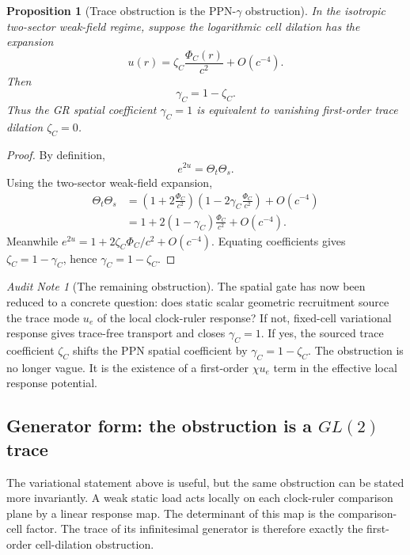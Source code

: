 \documentclass[11pt]{article}
\newtheorem{proposition}[theorem]{Proposition}
\theoremstyle{remark}
\newtheorem{audit}[theorem]{Audit Note}
\begin{document}
\begin{proposition}[Trace obstruction is the PPN-\(\gamma\) obstruction]
\label{prop:trace-obstruction-gamma}
In the isotropic two-sector weak-field regime, suppose the logarithmic cell dilation has the expansion
\[
        u(r)=\zeta_C\frac{\Phi_C(r)}{c^2}+O(c^{-4}).
\]
Then
\[
        \gamma_C=1-\zeta_C.
\]
Thus the GR spatial coefficient \(\gamma_C=1\) is equivalent to vanishing first-order trace dilation \(\zeta_C=0\).
\end{proposition}

\begin{proof}
By definition,
\[
        e^{2u}=\Theta_t\Theta_s.
\]
Using the two-sector weak-field expansion,
\[
\begin{aligned}
        \Theta_t\Theta_s
        &=\left(1+2\frac{\Phi_C}{c^2}\right)
          \left(1-2\gamma_C\frac{\Phi_C}{c^2}\right)+O(c^{-4})\\
        &=1+2(1-\gamma_C)\frac{\Phi_C}{c^2}+O(c^{-4}).
\end{aligned}
\]
Meanwhile \(e^{2u}=1+2\zeta_C\Phi_C/c^2+O(c^{-4})\).  Equating coefficients gives \(\zeta_C=1-\gamma_C\), hence \(\gamma_C=1-\zeta_C\).
\end{proof}

\begin{audit}[The remaining obstruction]
The spatial gate has now been reduced to a concrete question: does static scalar geometric recruitment source the trace mode \(u_e\) of the local clock-ruler response?  If not, fixed-cell variational response gives trace-free transport and closes \(\gamma_C=1\).  If yes, the sourced trace coefficient \(\zeta_C\) shifts the PPN spatial coefficient by \(\gamma_C=1-\zeta_C\).  The obstruction is no longer vague.  It is the existence of a first-order \(\chi u_e\) term in the effective local response potential.
\end{audit}


\subsection{Generator form: the obstruction is a \texorpdfstring{$GL(2)$}{GL(2)} trace}

The variational statement above is useful, but the same obstruction can be stated more invariantly.  A weak static load acts locally on each clock-ruler comparison plane by a linear response map.  The determinant of this map is the comparison-cell factor.  The trace of its infinitesimal generator is therefore exactly the first-order cell-dilation obstruction.
\end{document}
